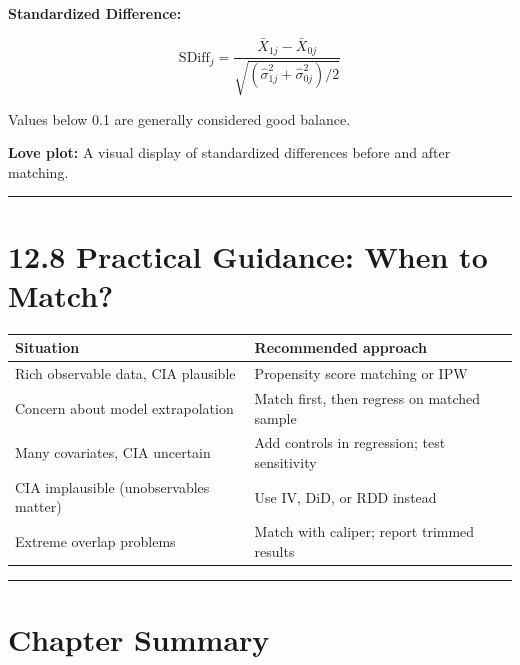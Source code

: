 \textbf{Standardized Difference:}

\[
\text{SDiff}_j = \frac{\bar{X}_{1j} - \bar{X}_{0j}}{\sqrt{(\hat{\sigma}^2_{1j} + \hat{\sigma}^2_{0j})/2}}
\]

Values below 0.1 are generally considered good balance.

\textbf{Love plot:} A visual display of standardized differences before and after matching.

\medskip\hrule\medskip

\section{12.8 Practical Guidance: When to Match?}

\begin{center}
\begin{tabular}{@{} l l @{}}
\toprule
\textbf{Situation} & \textbf{Recommended approach} \\
\midrule
Rich observable data, CIA plausible & Propensity score matching or IPW \\
Concern about model extrapolation & Match first, then regress on matched sample \\
Many covariates, CIA uncertain & Add controls in regression; test sensitivity \\
CIA implausible (unobservables matter) & Use IV, DiD, or RDD instead \\
Extreme overlap problems & Match with caliper; report trimmed results \\
\bottomrule
\end{tabular}
\end{center}

\medskip\hrule\medskip

\section{Chapter Summary}

